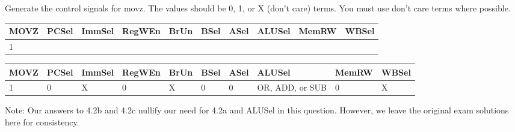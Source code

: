 \begin{blocksection}

\question
Generate the control signals for movz. The values should be 0, 1, or X (don’t care) terms. You must use don’t care terms where possible.

\begin{tabular}{ |l|l|l|l|l|l|l|l|l|l| } 
 \hline
 MOVZ & PCSel & ImmSel & RegWEn & BrUn & BSel & ASel & ALUSel & MemRW & WBSel \\ [10pt]
 \hline
 1 & & & & & & & & & \\ [10pt]
 \hline
\end{tabular}

    
\begin{solution}[0.5in]
 \begin{tabular}{ |l|l|l|l|l|l|l|l|l|l| } 
 \hline
 MOVZ & PCSel & ImmSel & RegWEn & BrUn & BSel & ASel & ALUSel & MemRW & WBSel \\ [10pt]
 \hline
 1 & 0 & X & 0 & X & 0 & 0 & OR, ADD, or SUB & 0 & X \\ [10pt]
 \hline
\end{tabular}
Note: Our answers to 4.2b and 4.2c nullify our need for 4.2a and ALUSel in this question. However, we leave the original exam solutions here for consistency.
\end{solution}

\end{blocksection}